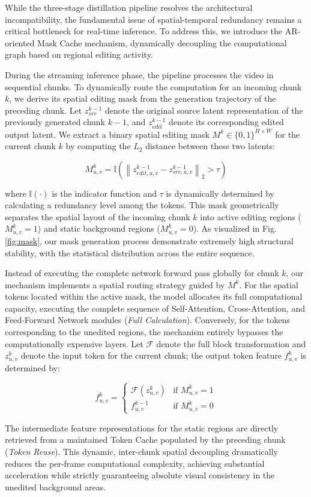 While the three-stage distillation pipeline resolves the architectural incompatibility, the fundamental issue of spatial-temporal redundancy remains a critical bottleneck for real-time inference. To address this, we introduce the AR-oriented Mask Cache mechanism, dynamically decoupling the computational graph based on regional editing activity.

During the streaming inference phase, the pipeline processes the video in sequential chunks. To dynamically route the computation for an incoming chunk $k$, we derive its spatial editing mask from the generation trajectory of the preceding chunk. Let $z_{src}^{k-1}$ denote the original source latent representation of the previously generated chunk $k-1$, and $z_{edit}^{k-1}$ denote its corresponding edited output latent. We extract a binary spatial editing mask $M^k\in\{0,1\}^{H\times W}$ for the current chunk $k$ by computing the $L_2$ distance between these two latents:

$$M^k_{u,v}=\mathbb{I}\left(\left\|z_{edit,u,v}^{k-1}-z_{src,u,v}^{k-1}\right\|_2>\tau\right)$$

where $\mathbb{I}(\cdot)$ is the indicator function and $\tau$ is dynamically determined by calculating a redundancy level among the tokens. This mask geometrically separates the spatial layout of the incoming chunk $k$ into active editing regions ($M^k_{u,v}=1$) and static background regions ($M^k_{u,v}=0$). As visualized in Fig. \ref{fig:mask}, our mask generation process demonstrate extremely high structural stability, with the statistical distribution across the entire sequence.

Instead of executing the complete network forward pass globally for chunk $k$, our mechanism implements a spatial routing strategy guided by $M^k$. For the spatial tokens located within the active mask, the model allocates its full computational capacity, executing the complete sequence of Self-Attention, Cross-Attention, and Feed-Forward Network modules (\textit{Full Calculation}). Conversely, for the tokens corresponding to the unedited regions, the mechanism entirely bypasses the computationally expensive layers. Let $\mathcal{F}$ denote the full block transformation and $z^k_{u,v}$ denote the input token for the current chunk; the output token feature $f^k_{u,v}$ is determined by:

$$f^k_{u,v}=\begin{cases}\mathcal{F}(z^k_{u,v})&\text{if }M^k_{u,v}=1\\f^{k-1}_{u,v}&\text{if }M^k_{u,v}=0\end{cases}$$

The intermediate feature representations for the static regions are directly retrieved from a maintained Token Cache populated by the preceding chunk (\textit{Token Reuse}). This dynamic, inter-chunk spatial decoupling dramatically reduces the per-frame computational complexity, achieving substantial acceleration while strictly guaranteeing absolute visual consistency in the unedited background areas.
